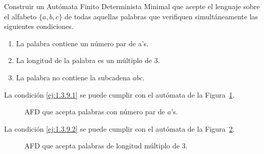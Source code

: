 \begin{ejercicio}\label{ej:1.3.9}
    Construir un Autómata Finito Determinista Minimal que acepte el lenguaje sobre el alfabeto $\{a,b,c\}$ de todas aquellas palabras que verifiquen simultáneamente las siguientes condiciones.
    \begin{enumerate}
        \item \label{ej:1.3.9.1}
        La palabra contiene un número par de a's.
        \item \label{ej:1.3.9.2}
        La longitud de la palabra es un múltiplo de 3.
        \item \label{ej:1.3.9.3}
        La palabra no contiene la subcadena $abc$.
    \end{enumerate}

    La condición \ref{ej:1.3.9.1} se puede cumplir con el autómata de la Figura~\ref{fig:1.3.9-AFD1}.
    \begin{figure}
        \centering
        \caption{AFD que acepta palabras con número par de $a$'s.}
        \label{fig:1.3.9-AFD1}
    \end{figure}

    La condición \ref{ej:1.3.9.2} se puede cumplir con el autómata de la Figura~\ref{fig:1.3.9-AFD2}.
    \begin{figure}
        \centering
        \caption{AFD que acepta palabras de longitud múltiplo de 3.}
        \label{fig:1.3.9-AFD2}
    \end{figure}


\end{ejercicio}
